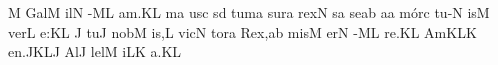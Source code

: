 \spatium
\custos M
\lineaproxima
\sgn Gal\punctum M\egn
\sgn {}il\punctum N\egn
\sgn {}{\'\ae}-\clivis ML\egn
\sgn {}a{m.}\punctum K\augmentum L\egn
\spatium
\divisiofinalis
\spatium
{}m\punctum a\egn
\sgn {}us\punctum c\egn
\spatium
{}s\punctum d\egn
\sgn tum\punctum a\egn
\spatium
\sgn sur\punctum a\egn
\sgn rex\punctum N\egn
\sgn {}{\'\i}s\punctum a\egn
\sgn se{}\punctum a\augmentum b\egn
\spatium
\divisiominima
\spatium
\sgn {}a{}\punctum a\egn
\spatium
\sgn m{\'o}r\punctum c\egn
\sgn tu-\punctum N\egn
\sgn {}is\punctum M\egn
\spatium
\sgn ver\punctum L\egn
\sgn {}e:\punctum K\augmentum L\egn
\spatium
\divisiominor
\spatium
\custos J
\lineaproxima
\sgn tu{}\punctum J\egn
\spatium
\sgn n{o}b\punctum M\egn
\sgn {}i{s,}\engl{}\punctum L\egn
\spatium
\sgn v{i}c\punctum N\egn
\sgn tor\punctum a\egn
\spatium
\sgn Re{x,}\punctum a\augmentum b\egn
\spatium
\divisiominima
\spatium
\sgn mis\punctum M\egn
\sgn {}er\punctum N\egn
{}-\clivis ML\egn
\sgn re.\punctum K\augmentum L\egn
\spatium
\divisiofinalis
\spatium
\sgn {}Am\torculus KLK\egn
\sgn {}e{n.}\pes JK\augmentumduplex LJ\egn
\spatium
\divisiominima
\spatium
\sgn {}Al\punctum J\egn
\sgn lel\punctum M\egn
{}i\cephalicus LK\egn
\sgn {}a.\punctum K\augmentum L\egn
\spatium
\Finisgregoriana

